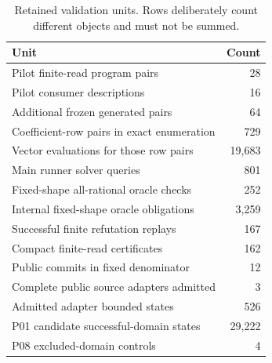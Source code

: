 \begin{table}[t]
\caption{Retained validation units. Rows deliberately count different objects and must not be summed.}\label{tab:validation}
\centering
\begin{tabular}{lr}
\toprule
Unit & Count\\\midrule
Pilot finite-read program pairs & 28\\
Pilot consumer descriptions & 16\\
Additional frozen generated pairs & 64\\
Coefficient-row pairs in exact enumeration & 729\\
Vector evaluations for those row pairs & 19,683\\
Main runner solver queries & 801\\
Fixed-shape all-rational oracle checks & 252\\
Internal fixed-shape oracle obligations & 3,259\\
Successful finite refutation replays & 167\\
Compact finite-read certificates & 162\\
Public commits in fixed denominator & 12\\
Complete public source adapters admitted & 3\\
Admitted adapter bounded states & 526\\
P01 candidate successful-domain states & 29,222\\
P08 excluded-domain controls & 4\\
\bottomrule
\end{tabular}
\end{table}
